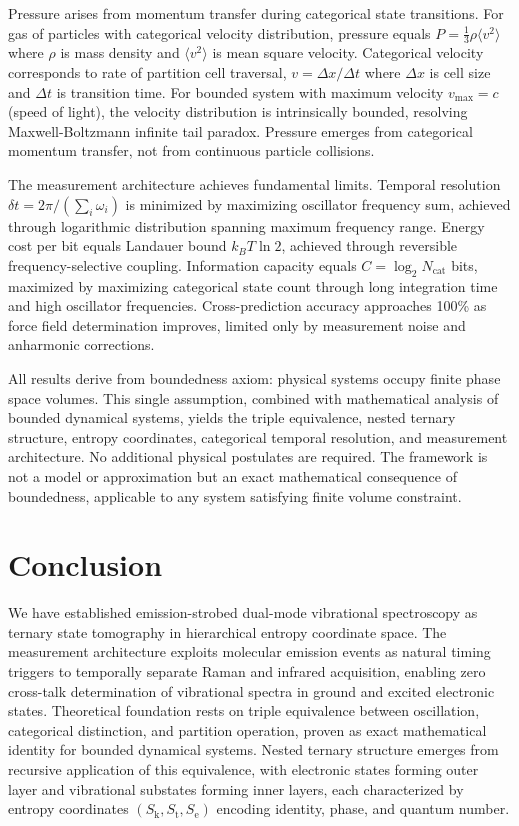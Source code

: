 \documentclass[twocolumn,10pt]{article}
\newcommand{\Sk}{S_{\text{k}}}
\newcommand{\St}{S_{\text{t}}}
\newcommand{\Se}{S_{\text{e}}}
\begin{document}
Pressure arises from momentum transfer during categorical state transitions. For gas of particles with categorical velocity distribution, pressure equals $P = \frac{1}{3} \rho \langle v^2 \rangle$ where $\rho$ is mass density and $\langle v^2 \rangle$ is mean square velocity. Categorical velocity corresponds to rate of partition cell traversal, $v = \Delta x / \Delta t$ where $\Delta x$ is cell size and $\Delta t$ is transition time. For bounded system with maximum velocity $v_{\max} = c$ (speed of light), the velocity distribution is intrinsically bounded, resolving Maxwell-Boltzmann infinite tail paradox. Pressure emerges from categorical momentum transfer, not from continuous particle collisions.

The measurement architecture achieves fundamental limits. Temporal resolution $\delta t = 2\pi / (\sum_i \omega_i)$ is minimized by maximizing oscillator frequency sum, achieved through logarithmic distribution spanning maximum frequency range. Energy cost per bit equals Landauer bound $k_B T \ln 2$, achieved through reversible frequency-selective coupling. Information capacity equals $C = \log_2 N_{\text{cat}}$ bits, maximized by maximizing categorical state count through long integration time and high oscillator frequencies. Cross-prediction accuracy approaches 100\% as force field determination improves, limited only by measurement noise and anharmonic corrections.

All results derive from boundedness axiom: physical systems occupy finite phase space volumes. This single assumption, combined with mathematical analysis of bounded dynamical systems, yields the triple equivalence, nested ternary structure, entropy coordinates, categorical temporal resolution, and measurement architecture. No additional physical postulates are required. The framework is not a model or approximation but an exact mathematical consequence of boundedness, applicable to any system satisfying finite volume constraint.

\section{Conclusion}

We have established emission-strobed dual-mode vibrational spectroscopy as ternary state tomography in hierarchical entropy coordinate space. The measurement architecture exploits molecular emission events as natural timing triggers to temporally separate Raman and infrared acquisition, enabling zero cross-talk determination of vibrational spectra in ground and excited electronic states. Theoretical foundation rests on triple equivalence between oscillation, categorical distinction, and partition operation, proven as exact mathematical identity for bounded dynamical systems. Nested ternary structure emerges from recursive application of this equivalence, with electronic states forming outer layer and vibrational substates forming inner layers, each characterized by entropy coordinates $(\Sk, \St, \Se)$ encoding identity, phase, and quantum number.
\end{document}
